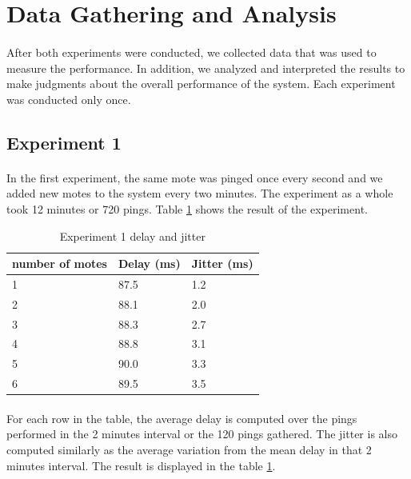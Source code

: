 \documentclass[12pt,a4paper,final]{report}
\begin{document}
\section{Data Gathering and Analysis}
\paragraph{}
After both experiments were conducted, we collected data that was used to measure the performance. In addition, we analyzed and interpreted the results to make judgments about the overall performance of the system. Each experiment was conducted only once.
\subsection{Experiment 1}
\paragraph{}
In the first experiment, the same mote was pinged once every second and we added new motes to the system every two minutes. The experiment as a whole took 12 minutes or 720 pings. Table \ref{table:exp1} shows the result of the experiment.

\begin{table}[htbp]
    \begin{tabular}{lll}
    \hline
    number of motes & Delay (ms) & Jitter (ms) \\\hline
    1               & 87.5         & 1.2         \\ 
    2               & 88.1         & 2.0         \\
    3               & 88.3        & 2.7         \\
    4               & 88.8         & 3.1         \\
    5               & 90.0         & 3.3         \\
    6               & 89.5         & 3.5         \\
    \end{tabular}
    \caption{Experiment 1 delay and jitter}
    \label{table:exp1}
\end{table}
\paragraph{}
For each row in the table, the average delay is computed over the pings performed in the 2 minutes interval or the 120 pings gathered. The jitter is also computed similarly as the average variation from the mean delay in that 2 minutes interval. The result is displayed in the table \ref{table:exp1}. 
\end{document}
